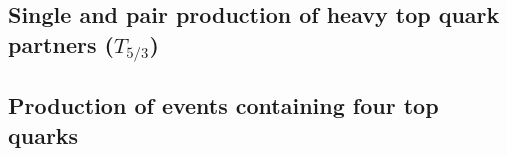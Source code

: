 \subsection{Single and pair production of heavy top quark partners ($T_{5/3}$)}


\subsection{Production of events containing four top quarks}



